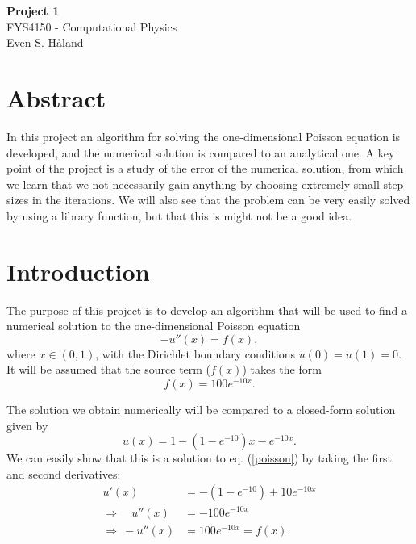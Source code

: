 \documentclass[12pt, a4paper]{article}
\begin{document}
\begin{titlepage}
\begin{center}
\vspace*{6cm}
\Huge
\textbf{Project 1} \\
\vspace*{1cm}
\LARGE
FYS4150 - Computational Physics \\ 
\vspace*{10cm}
Even S. Håland 
\end{center}
\end{titlepage}

\section*{Abstract}

In this project an algorithm for solving the one-dimensional Poisson equation is developed, and the 
numerical solution is compared to an analytical one. A key point of the project is a study of the
error of the numerical solution, from which we learn that we not necessarily gain anything by choosing 
extremely small step sizes in the iterations. We will also see that the problem can be very easily 
solved by using a library function, but that this is might not be a good idea.  

\section{Introduction}

The purpose of this project is to develop an algorithm that will be used to find a numerical solution 
to the one-dimensional Poisson equation 
\begin{equation}
-u''(x) = f(x), 
\label{poisson}
\end{equation}
where $x\in (0,1)$, with the Dirichlet boundary conditions $u(0)=u(1)=0$. It will be assumed that the 
source term ($f(x)$) takes the form 
\begin{equation}
f(x) = 100e^{-10x}. 
\label{f(x)}
\end{equation}

The solution we obtain numerically will be compared to a closed-form solution given by 
\begin{equation}
u(x) = 1- \left(1-e^{-10}\right)x - e^{-10x}. 
\label{closed-form}
\end{equation}
We can easily show that this is a solution to eq. (\ref{poisson}) by taking the first and second 
derivatives: 
\begin{align*}
    u'(x) & = -\left(1-e^{-10}\right) + 10e^{-10x} \\ 
\Rightarrow \quad  u''(x) & = -100e^{-10x} \\
\Rightarrow \: -u''(x) & = 100e^{-10x} = f(x).  
\end{align*}
\end{document}

